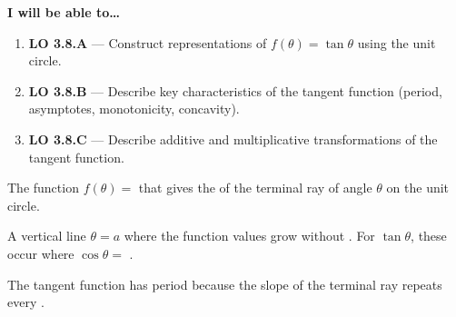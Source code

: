 \documentclass[10pt]{article}
\begin{document}
\namedateperiod

\vspace{0.08in}

\begin{objectivebox}
\textbf{I will be able to\ldots}
\begin{enumerate}[leftmargin=1.5em, itemsep=4pt]
  \item \textbf{LO 3.8.A} --- Construct representations of $f(\theta)=\tan\theta$
    using the unit circle. 
  \item \textbf{LO 3.8.B} --- Describe key characteristics of the tangent function
    (period, asymptotes, monotonicity, concavity). 
  \item \textbf{LO 3.8.C} --- Describe additive and multiplicative transformations
    of the tangent function. 
\end{enumerate}
\end{objectivebox}

\vspace{0.06in}

\begin{vocabbox}
\begin{description}[leftmargin=0pt, itemsep=6pt]
  \item[\termblanklong{tangent function}]
    The function $f(\theta) = $ \ans{$\sin\theta/\cos\theta$} that gives the
     of the terminal ray of angle $\theta$ on the unit circle.

  \item[\termblanklong{vertical asymptote}]
    A vertical line $\theta = a$ where the function values grow without
    .  For $\tan\theta$, these occur where
    $\cos\theta = $ .

  \item[\termblanklong{period (tangent)}]
    The tangent function has period \ans{$\pi$} because the
    slope of the terminal ray repeats every
    .
\end{description}
\end{vocabbox}
\end{document}
